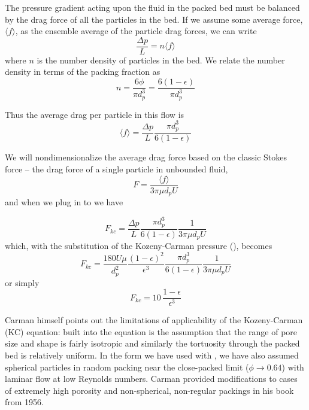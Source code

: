 The pressure gradient acting upon the fluid in the packed bed must be balanced by the drag force of all the particles in the bed. If we assume some average force, $\langle f \rangle$, as the ensemble average of the particle drag forces, we can write
\begin{equation}
    \frac{\Delta p}{L} = n \langle f \rangle
\end{equation}
where $n$ is the number density of particles in the bed. We relate the number density in terms of the packing fraction as
\begin{equation}
    n = \frac{6\phi}{\pi d_p^3} = \frac{6(1-\epsilon)}{\pi d_p^3}
\end{equation}

Thus the average drag per particle in this flow is
\begin{equation}\label{eq:average-drag}
    \langle f \rangle = \frac{\Delta p}{L}\frac{\pi d_p^3}{6(1-\epsilon)}
\end{equation}

We will nondimensionalize the average drag force based on the classic Stokes force -- the drag force of a single particle in unbounded fluid,
\begin{equation}\label{eq:non-dim-drag}
    F = \frac{\langle f \rangle}{3\pi \mu d_p U}
\end{equation}
and when we plug in  to  we have

\begin{equation}
    F_{kc} = \frac{\Delta p}{L}\frac{\pi d_p^3}{6(1-\epsilon)}\frac{1}{3\pi \mu d_p U}
\end{equation}
which, with the substitution of the Kozeny-Carman pressure (), becomes
\begin{equation}
    F_{kc} = \frac{180 U \mu}{d_p^2} \frac{(1-\epsilon)^2}{\epsilon^3}\frac{\pi d_p^3}{6(1-\epsilon)}\frac{1}{3\pi \mu d_p U}
\end{equation}
or simply
\begin{equation}\label{eq:K-C-non-dim}
    F_{kc} = 10\, \frac{1-\epsilon}{\epsilon^3}
\end{equation}

Carman himself\cite{Carman1956} points out the limitations of applicability of the Kozeny-Carman (KC) equation: built into the equation is the assumption that the range of pore size and shape is fairly isotropic and similarly the tortuosity through the packed bed is relatively uniform. In the form we have used with , we have also assumed spherical particles in random packing near the close-packed limit ($\phi \rightarrow 0.64$) with laminar flow at low Reynolds numbers. Carman provided modifications to cases of extremely high porosity and non-spherical, non-regular packings in his book from 1956.\cite{Carman1956}

